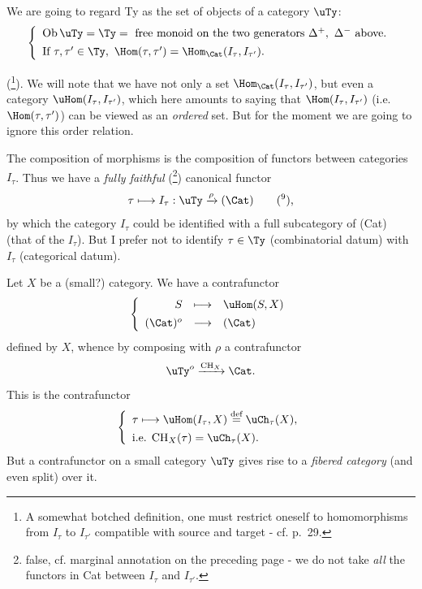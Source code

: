 We are going to regard Ty as the set of objects of a category $\uTy$:
\[
\left\{
\begin{array}{l}
\mathrm{Ob}\,\uTy=\Ty=\ \text{free monoid on the two generators } \Delta^+,\ \Delta^- \text{ above.}\\[1ex]
\text{If } \tau,\tau'\in\Ty,\ \Hom(\tau,\tau')=\Hom_{\Cat}(I_\tau,I_{\tau'}).
\end{array}
\right.
\]

(\footnote[7]{A somewhat botched definition, one must restrict oneself to homomorphisms from $I_\tau$ to $I_{\tau'}$ compatible with source and target - cf. p.~29.}). We will note that we have not only a set $\Hom_{\Cat}(I_\tau,I_{\tau'})$, but even a category $\uHom(I_\tau,I_{\tau'})$, which here amounts to saying that $\Hom(I_\tau,I_{\tau'})$ (i.e. $\Hom(\tau,\tau')$) can be viewed as an \textit{ordered} set. But for the moment we are going to ignore this order relation.

The composition of morphisms is the composition of functors between categories $I_\tau$. Thus we have a \textit{fully faithful} (\footnote[8]{false, cf. marginal annotation on the preceding page - we do not take \textit{all} the functors in Cat between $I_\tau$ and $I_{\tau'}$.}) canonical functor
\[
\tau \longmapsto I_\tau : \uTy \xrightarrow{\rho} (\Cat) \qquad \text{(\footnotemark[9]),}
\]
by which the category $I_\tau$ could be identified with a full subcategory of (Cat) (that of the $I_\tau$). But I prefer not to identify $\tau\in\Ty$ (combinatorial datum) with $I_\tau$ (categorical datum).

Let $X$ be a (small?) category. We have a contrafunctor
\[
\left\{
\begin{array}{rcl}
S & \longmapsto & \uHom(S,X)\\[1ex]
(\Cat)^o & \longrightarrow & (\Cat)
\end{array}
\right.
\]
defined by $X$, whence by composing with $\rho$ a contrafunctor
\[
\uTy^{o} \xrightarrow{\mathrm{CH}_X} \Cat.
\]
This is the contrafunctor
\[
\left\{
\begin{array}{l}
\tau \longmapsto \uHom(I_\tau,X) \overset{\text{def}}{=} \uCh_\tau(X),\\[1ex]
\text{i.e. } \mathrm{CH}_X(\tau)=\uCh_\tau(X).
\end{array}
\right.
\]
But a contrafunctor on a small category $\uTy$ gives rise to a \textit{fibered category} (and even split) over it.

